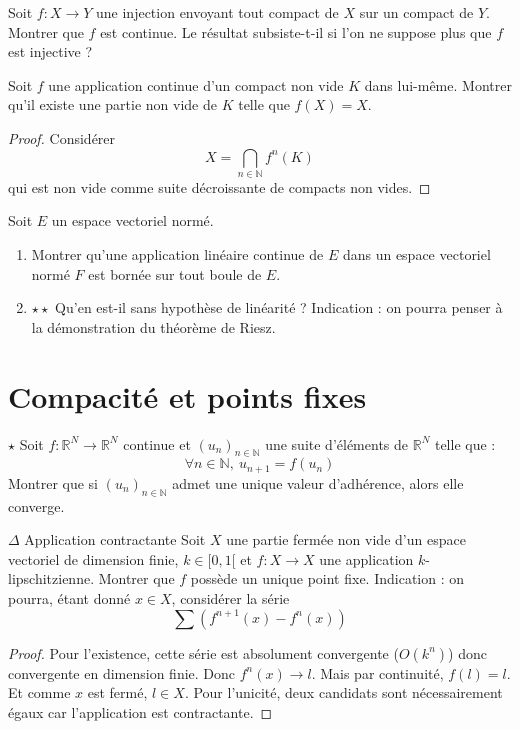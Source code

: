 \documentclass[french,a4paper]{article}
\newcommand{\N}{\mathbb{N}}
\newcommand{\R}{\mathbb{R}}
\theoremstyle{plain}
\theoremstyle{definition}
\theoremstyle{remark}
\begin{document}
\begin{ex}{}
	Soit $f:X\to Y$ une injection envoyant tout compact de $X$ sur un compact de $Y$. Montrer que $f$ est continue. Le résultat subsiste-t-il si l'on ne suppose plus que $f$ est injective ?
\end{ex}

\begin{ex}{}
	Soit $f$ une application continue d'un compact non vide $K$ dans lui-même. Montrer qu'il existe une partie non vide de $K$ telle que $f(X)=X$.
\end{ex}
\begin{proof}
	Considérer $$X=\bigcap_{n\in\N}f^n(K)$$ qui est non vide comme suite décroissante de compacts non vides.
\end{proof}

\begin{ex}{}
	Soit $E$ un espace vectoriel normé.
	\begin{enumerate}
		\item Montrer qu'une application linéaire continue de $E$ dans un espace vectoriel normé $F$ est bornée sur tout boule de $E$.
		\item $\star\star$ Qu'en est-il sans hypothèse de linéarité ? Indication : on pourra penser à la démonstration du théorème de Riesz.
	\end{enumerate}
\end{ex}

\section{Compacité et points fixes}

\begin{ex}{$\star$}
	Soit $f:\R^N\to\R^N$ continue et $(u_n)_{n\in\N}$ une suite d'éléments de $\R^N$ telle que : $$\forall n\in\N,\ u_{n+1}=f(u_n)$$ Montrer que si $(u_n)_{n\in\N}$ admet une unique valeur d'adhérence, alors elle converge.
\end{ex}

\begin{ex}{$\Delta$ Application contractante}
	Soit $X$ une partie fermée non vide d'un espace vectoriel de dimension finie, $k\in[0,1[$ et $f:X\to X$ une application $k$-lipschitzienne. Montrer que $f$ possède un unique point fixe. Indication : on pourra, étant donné $x\in X$, considérer la série $$\sum (f^{n+1}(x)-f^n(x))$$
\end{ex}
\begin{proof}
	Pour l'existence, cette série est absolument convergente ($O(k^n)$) donc convergente en dimension finie. Donc $f^{n}(x)\to l$. Mais par continuité, $f(l)=l$. Et comme $x$ est fermé, $l\in X$. Pour l'unicité, deux candidats sont nécessairement égaux car l'application est contractante.
\end{proof}
\end{document}
